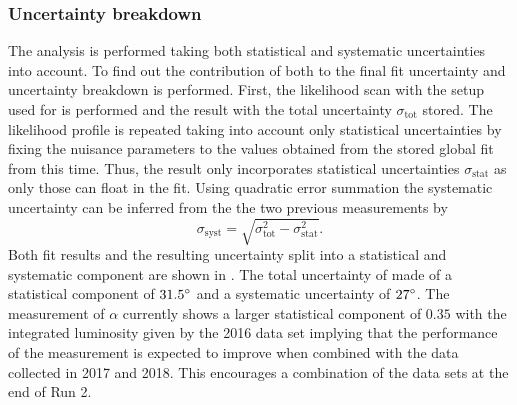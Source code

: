 \subsubsection{Uncertainty breakdown}
The analysis  is performed taking both statistical and systematic uncertainties into account. To find out the contribution of both to the final fit uncertainty and uncertainty breakdown is performed.
First, the likelihood scan with the setup used for  is performed and the result with the total uncertainty $\sigma_\text{tot}$ stored.
The likelihood profile is repeated taking into account only statistical uncertainties by fixing the nuisance parameters to the values obtained from the stored global fit from  this time. Thus, the result only incorporates statistical uncertainties $\sigma_\text{stat}$ as only those can float in the fit.
Using quadratic error summation the systematic uncertainty can be inferred from the the two previous measurements by
\begin{equation}
    \sigma_\text{syst} = \sqrt{\sigma_\text{tot}^2 - \sigma_\text{stat}^2}.
\end{equation} 
Both fit results and the resulting uncertainty split into a statistical and systematic component are shown in .
The total uncertainty of made of a statistical component of $\text{31.5}^{\circ}$ and a systematic uncertainty of $\text{27}^{\circ}$.
The measurement of $\alpha$ currently shows a larger statistical component of $0.35$ with the integrated luminosity given by the 2016 data set implying that the performance of the measurement is expected to improve when combined with the data collected in 2017 and 2018. This encourages a combination of the data sets at the end of Run 2. 



